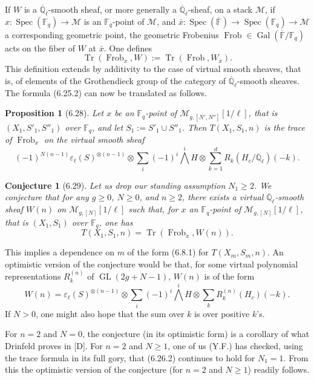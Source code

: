 \documentclass[10pt]{article}
\newcommand{\Fq}{\mathbb F_q}
\newcommand{\Fb}{\mathbb F}
\newcommand{\Ql}{\overline{\mathbb Q}_{\ell}}
\newcommand{\GL}{\operatorname{GL}}
\newcommand{\Gal}{\operatorname{Gal}}
\newcommand{\Spec}{\operatorname{Spec}}
\newcommand{\Frob}{\operatorname{Frob}}
\newcommand{\Tr}{\operatorname{Tr}}
\theoremstyle{deligne}
\newtheorem*{proposition*}{Proposition}
\newtheorem*{conjecture*}{Conjecture}
\begin{document}
If $W$ is a $\Ql$-smooth sheaf, or more generally a $\Ql$-sheaf, on a stack $\mathcal M$, if $x:\Spec(\Fq)\to\mathcal M$ is an $\Fq$-point of $\mathcal M$, and $\bar x:\Spec(\overline{\Fb})\to\Spec(\Fq)\to\mathcal M$ a corresponding geometric point, the geometric Frobenius $\Frob\in\Gal(\overline{\Fb}/\Fq)$ acts on the fiber of $W$ at $\bar x$. One defines
\[
\Tr(\Frob_x,W):=\Tr(\Frob,W_{\bar x}).
\]
This definition extends by additivity to the case of virtual smooth sheaves, that is, of elements of the Grothendieck group of the category of $\Ql$-smooth sheaves. The formula (6.25.2) can now be translated as follows.

\begin{proposition*}[6.28]
Let $x$ be an $\Fq$-point of $\mathcal M_{g,[N',N'']}[1/\ell]$, that is $(X_1,S'_1,S''_1)$ over $\Fq$, and let $S_1:=S'_1\cup S''_1$. Then $T(X_1,S_1,n)$ is the trace of $\Frob_x$ on the virtual smooth sheaf
\begin{equation}\tag{6.28.1}
(-1)^{N(n-1)}\varepsilon_\ell(S)^{\otimes(n-1)}\otimes
\sum_i(-1)^i\bigwedge^iH\otimes
\sum_{k=1}^d R_k(H_c/\Ql)(-k).
\end{equation}
\end{proposition*}

\begin{conjecture*}[6.29]
Let us drop our standing assumption $N_1\ge2$. We conjecture that for any $g\ge0$, $N\ge0$, and $n\ge2$, there exists a virtual $\Ql$-smooth sheaf $W(n)$ on $\mathcal M_{g,[N]}[1/\ell]$ such that, for $x$ an $\Fq$-point of $\mathcal M_{g,[N]}[1/\ell]$, that is $(X_1,S_1)$ over $\Fq$, one has
\[
T(X_1,S_1,n)=\Tr(\Frob_x,W(n)).
\]
\end{conjecture*}
This implies a dependence on $m$ of the form (6.8.1) for $T(X_m,S_m,n)$. An optimistic version of the conjecture would be that, for some virtual polynomial representations $R_k^{(n)}$ of $\GL(2g+N-1)$, $W(n)$ is of the form
\[
W(n)=\varepsilon_\ell(S)^{\otimes(n-1)}\otimes\sum_i(-1)^i\bigwedge^iH\otimes\sum_k R_k^{(n)}(H_c)(-k).
\]
If $N>0$, one might also hope that the sum over $k$ is over positive $k$'s.

For $n=2$ and $N=0$, the conjecture (in its optimistic form) is a corollary of what Drinfeld proves in [D]. For $n=2$ and $N\ge1$, one of us (Y.F.) has checked, using the trace formula in its full gory, that (6.26.2) continues to hold for $N_1=1$. From this the optimistic version of the conjecture (for $n=2$ and $N\ge1$) readily follows.
\end{document}
